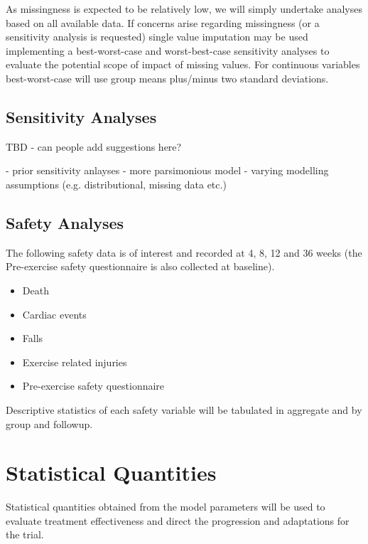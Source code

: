 \documentclass[
]{article}
\begin{document}
As missingness is expected to be relatively low, we will simply undertake analyses based on all available data.
If concerns arise regarding missingness (or a sensitivity analysis is requested) single value imputation may be used implementing a best-worst-case and worst-best-case sensitivity analyses to evaluate the potential scope of impact of missing values.
For continuous variables best-worst-case will use group means plus/minus two standard deviations.

\hypertarget{sensitivity-analyses}{%
  \subsection{Sensitivity Analyses}\label{sensitivity-analyses}}

TBD - can people add suggestions here?

- prior sensitivity anlayses
- more parsimonious model
- varying modelling assumptions (e.g. distributional, missing data etc.)


\hypertarget{safety-analyses}{%
  \subsection{Safety Analyses}\label{safety-analyses}}

The following safety data is of interest and recorded at 4, 8, 12 and 36 weeks (the Pre-exercise safety questionnaire is also collected at baseline).

\begin{itemize}
  \item Death
  \item Cardiac events
  \item Falls
  \item Exercise related injuries
  \item Pre-exercise safety questionnaire
\end{itemize}

Descriptive statistics of each safety variable will be tabulated in aggregate and by group and followup.

\clearpage

\hypertarget{statistical-quantities}{%
  \section{Statistical Quantities}\label{statistical-quantities}}

Statistical quantities obtained from the model parameters will be used to evaluate treatment effectiveness and direct the progression and adaptations for the trial.
\end{document}
